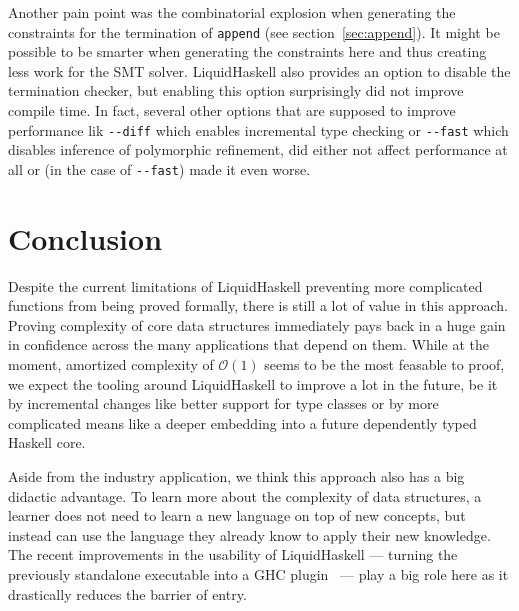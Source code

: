 \documentclass[sigplan,screen]{acmart}
\renewcommand\O[1]{$\mathcal{O}(#1)$}
\begin{document}
Another pain point was the combinatorial explosion when generating the constraints for the termination of \texttt{append} (see section~\ref{sec:append}). It might be possible to be smarter when generating the constraints here and thus creating less work for the SMT solver. LiquidHaskell also provides an option to disable the termination checker, but enabling this option surprisingly did not improve compile time. In fact, several other options that are supposed to improve performance lik \texttt{{-}{-}diff} which enables incremental type checking or \texttt{{-}{-}fast} which disables inference of polymorphic refinement, did either not affect performance at all or (in the case of \texttt{{-}{-}fast}) made it even worse.

\section{Conclusion}

Despite the current limitations of LiquidHaskell preventing more complicated functions from being proved formally, there is still a lot of value in this approach. Proving complexity of core data structures immediately pays back in a huge gain in confidence across the many applications that depend on them. While at the moment, amortized complexity of \O{1} seems to be the most feasable to proof, we expect the tooling around LiquidHaskell to improve a lot in the future, be it by incremental changes like better support for type classes or by more complicated means like a deeper embedding into a future dependently typed Haskell core.

Aside from the industry application, we think this approach also has a big didactic advantage. To learn more about the complexity of data structures, a learner does not need to learn a new language on top of new concepts, but instead can use the language they already know to apply their new knowledge. The recent improvements in the usability of LiquidHaskell --- turning the previously standalone executable into a GHC plugin~\cite{lh_plugin} --- play a big role here as it drastically reduces the barrier of entry.

\end{document}
